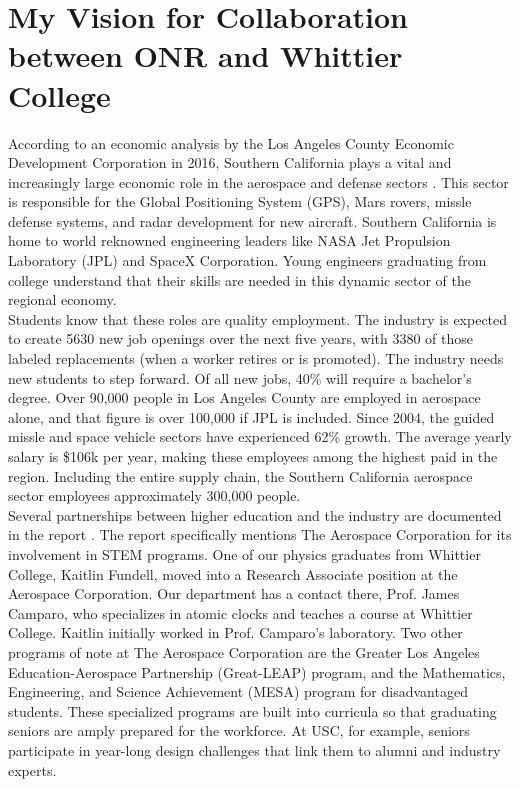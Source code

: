 \documentclass[../../../main.tex]{subfiles}
\begin{document}
\section{My Vision for Collaboration between ONR and Whittier College}
\label{sec:naval_collaboration}

According to an economic analysis by the Los Angeles County Economic Development Corporation in 2016, Southern California plays a vital and increasingly large economic role in the aerospace and defense sectors \cite{laedc}.  This sector is responsible for the Global Positioning System (GPS), Mars rovers, missle defense systems, and radar development for new aircraft.  Southern California is home to world reknowned engineering leaders like NASA Jet Propulsion Laboratory (JPL) and SpaceX Corporation.  Young engineers graduating from college understand that their skills are needed in this dynamic sector of the regional economy.
\\
\vspace{0.25cm}
Students know that these roles are quality employment.  The industry is expected to create 5630 new job openings over the next five years, with 3380 of those labeled replacements (when a worker retires or is promoted).  The industry needs new students to step forward.  Of all new jobs, 40\% will require a bachelor's degree.  Over 90,000 people in Los Angeles County are employed in aerospace alone, and that figure is over 100,000 if JPL is included.  Since 2004, the guided missle and space vehicle sectors have experienced 62\% growth.  The average yearly salary is \$106k per year, making these employees among the highest paid in the region.  Including the entire supply chain, the Southern California aerospace sector employees approximately 300,000 people.
\\
\vspace{0.25cm}
Several partnerships between higher education and the industry are documented in the report \cite{laedc}.  The report specifically mentions The Aerospace Corporation for its involvement in STEM programs.  One of our physics graduates from Whittier College, Kaitlin Fundell, moved into a Research Associate position at the Aerospace Corporation.  Our department has a contact there, Prof. James Camparo, who specializes in atomic clocks and teaches a course at Whittier College.  Kaitlin initially worked in Prof. Camparo's laboratory.  Two other programs of note at The Aerospace Corporation are the Greater Los Angeles Education-Aerospace Partnership (Great-LEAP) program, and the Mathematics, Engineering, and Science Achievement (MESA) program for disadvantaged students.  These specialized programs are built into curricula so that graduating seniors are amply prepared for the workforce.  At USC, for example, seniors participate in year-long design challenges that link them to alumni and industry experts.
\end{document}
